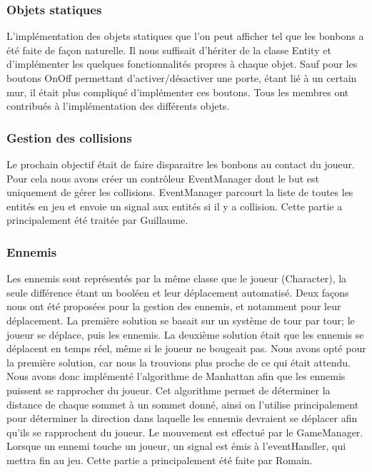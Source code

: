 \documentclass[a4paper]{article}
\begin{document}
\subsubsection{Objets statiques}
L'implémentation des objets statiques que l'on peut afficher tel que les
bonbons a été faite de façon naturelle. Il nous suffisait d'hériter de la
classe Entity et d'implémenter les quelques fonctionnalités propres à chaque
objet. Sauf pour les boutons OnOff permettant d'activer/désactiver une porte,
étant lié à un certain mur, il était plus compliqué d'implémenter ces boutons.
Tous les membres ont contribués à l'implémentation des différents objets.

\subsubsection{Gestion des collisions}
Le prochain objectif était de faire disparaitre les bonbons au contact du
joueur. Pour cela nous avons créer un contrôleur EventManager dont le but est
uniquement de gérer les collisions. EventManager parcourt la liste de toutes
les entités en jeu et envoie un signal aux entités si il y a collision.
Cette partie a principalement été traitée par Guillaume.

\subsubsection{Ennemis}
Les ennemis sont représentés par la même classe que le joueur (Character), la
seule différence étant un booléen et leur déplacement automatisé.
Deux façons nous ont été proposées pour la gestion des ennemis, et notamment
pour leur déplacement. La première solution se basait sur un système de tour par
tour; le joueur se déplace, puis les ennemis. La deuxième solution était que
les ennemis se déplacent en temps réel, même si le joueur ne bougeait pas.
Nous avons opté pour la première solution, car nous la trouvions plus proche
de ce qui était attendu.
Nous avons donc implémenté l'algorithme de Manhattan afin que les ennemis
puissent se rapprocher du joueur. Cet algorithme permet de déterminer la
distance de chaque sommet à un sommet donné, ainsi on l'utilise principalement
pour déterminer la direction dans laquelle les ennemis devraient se déplacer
afin qu'ils se rapprochent du joueur. Le mouvement est effectué par le
GameManager.
Lorsque un ennemi touche un joueur, un signal est émis à l'eventHandler, qui
mettra fin au jeu.
Cette partie a principalement été faite par Romain.
\end{document}
